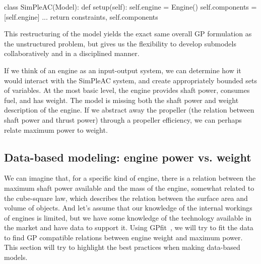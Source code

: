 \begin{python}
    class SimPleAC(Model):
        def setup(self):
            self.engine = Engine()
            self.components = [self.engine]
            ...
            return constraints, self.components
\end{python}

This restructuring of the model yields the exact same overall \gls{GP} formulation
as the unstructured problem, but gives us the flexibility to develop submodels
collaboratively and in a disciplined manner.

If we think of an engine as an input-output system, we can determine how it
would interact with the SimPleAC system, and create appropriately bounded
sets of variables.
At the most basic level, the engine provides shaft power, consumes fuel,
and has weight. The model is missing both the shaft power and weight description
of the engine. If we abstract away the propeller (the relation between shaft
power and thrust power) through a propeller efficiency,
we can perhaps relate maximum power to weight.

\subsection{Data-based modeling: engine power vs. weight}
\label{s:datafit}

We can imagine that, for a specific kind of engine, there is a relation between the
maximum shaft power available and the mass of the engine, somewhat related to the
cube-square law, which describes the relation between the surface area and volume
of objects. And let's assume that our knowledge of the internal workings of engines
is limited, but we have some knowledge of the technology available in the market
and have data to support it. Using GPfit~\cite{gpfitpaper}, we will try to fit the data to find
\gls{GP} compatible relations between engine weight and maximum power. This section
will try to highlight the best practices when making data-based models.

